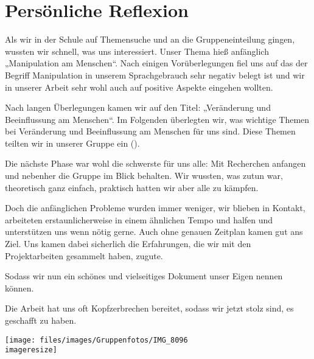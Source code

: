 \chapter{Persönliche Reflexion}
\label{sec:reflexion}

Als wir in der Schule auf Themensuche und an die Gruppeneinteilung gingen, wussten wir schnell, was
uns interessiert. Unser Thema hieß anfänglich „Manipulation am Menschen“. Nach einigen
Vorüberlegungen fiel uns auf das der Begriff Manipulation in unserem Sprachgebrauch sehr negativ
belegt ist und wir in unserer Arbeit sehr wohl auch auf positive Aspekte eingehen wollten.

Nach langen Überlegungen kamen wir auf den Titel: „Veränderung und Beeinflussung am Menschen“. Im
Folgenden überlegten wir, was wichtige Themen bei Veränderung und Beeinflussung am Menschen für uns
sind. Diese Themen teilten wir in unserer Gruppe ein ().

Die nächste Phase war wohl die schwerste für uns alle: Mit Recherchen anfangen und nebenher die
Gruppe im Blick behalten. Wir wussten, was zutun war, theoretisch ganz einfach, praktisch hatten
wir aber alle zu kämpfen.

Doch die anfänglichen Probleme wurden immer weniger, wir blieben in Kontakt, arbeiteten
erstaunlicherweise in einem ähnlichen Tempo und halfen und unterstützen uns wenn nötig gerne. Auch
ohne genauen Zeitplan kamen gut ans Ziel. Uns kamen dabei sicherlich die
Erfahrungen, die wir mit den Projektarbeiten gesammelt haben, zugute.

Sodass wir nun ein schönes und vielseitiges Dokument unser Eigen nennen können.

Die Arbeit hat uns oft Kopfzerbrechen bereitet, sodass wir jetzt stolz sind, es geschafft zu haben.

\begin{figurewrapper}
	\texttt{[image: files/images/Gruppenfotos/IMG\_8096\\imageresize]}
	\label{fig:group_picture}
\end{figurewrapper}
